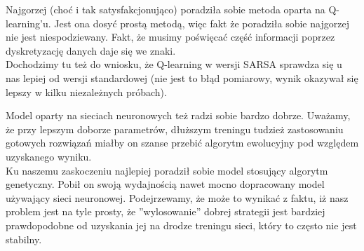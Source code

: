 \documentclass[12pt, A4]{article}
\begin{document}
	Najgorzej (choć i tak satysfakcjonująco) poradziła sobie metoda oparta na Q-learning'u. Jest ona dosyć prostą metodą, więc fakt że poradziła sobie najgorzej nie jest niespodziewany. Fakt, że musimy poświęcać część informacji poprzez dyskretyzację danych daje się we znaki. \\
	Dochodzimy tu też do wniosku, że Q-learning w wersji SARSA sprawdza się u nas lepiej od wersji standardowej (nie jest to błąd pomiarowy, wynik okazywał się lepszy w kilku niezależnych próbach).

	Model oparty na sieciach neuronowych też radzi sobie bardzo dobrze. Uważamy, że przy lepszym doborze parametrów, dłuższym treningu tudzież zastosowaniu gotowych rozwiązań miałby on szanse przebić algorytm ewolucyjny pod względem uzyskanego wyniku. \\

	Ku naszemu zaskoczeniu najlepiej poradził sobie model stosujący algorytm genetyczny. Pobił on swoją wydajnością nawet mocno dopracowany model używający sieci neuronowej. Podejrzewamy, że może to wynikać z faktu, iż nasz problem jest na tyle prosty, że ''wylosowanie'' dobrej strategii jest bardziej prawdopodobne od uzyskania jej na drodze treningu sieci, który to często nie jest stabilny. \\
\end{document}
